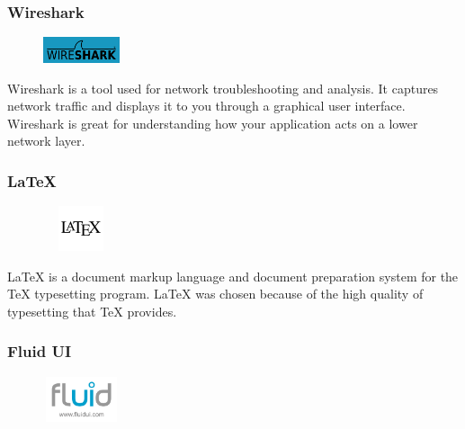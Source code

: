 \subsubsection{Wireshark}
\begin{figure}
  \vspace{0pt}
  \begin{center}
  \vspace{-30pt}
    \includegraphics[width=0.2\textwidth]{Wireshark}
  \end{center}

\end{figure}
Wireshark is a tool used for network troubleshooting and analysis. It captures network traffic and displays it to you through a graphical user interface. Wireshark is great for understanding how your application acts on a lower network layer.

\subsubsection{LaTeX}
\begin{figure}
  \vspace{-35pt}
  \begin{center}
    \includegraphics[width=0.2\textwidth, height=50px]{Latex}
  \end{center}

\end{figure}
LaTeX is a document markup language and document preparation system for the TeX typesetting program. LaTeX was chosen because of the high quality of typesetting that TeX provides.

\subsubsection{Fluid UI}

\begin{figure}
  \vspace{-35pt}
  \begin{center}
    \includegraphics[width=0.2\textwidth, height=50px]{fluidui}
  \end{center}

\end{figure}

